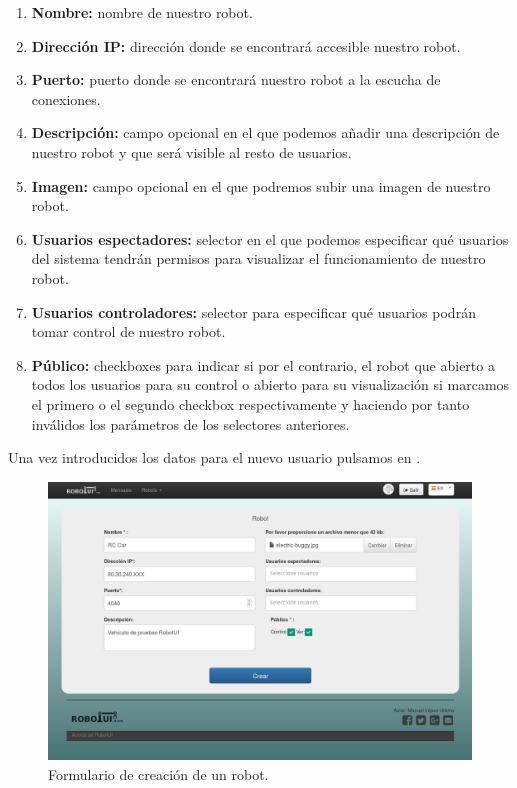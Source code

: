 \begin{enumerate}
 \item \textbf{Nombre:} nombre de nuestro robot.
 \item \textbf{Dirección IP:} dirección donde se encontrará accesible nuestro robot.
 \item \textbf{Puerto:} puerto donde se encontrará nuestro robot a la escucha de conexiones.
 \item \textbf{Descripción:} campo opcional en el que podemos añadir una descripción de nuestro robot y que será visible al resto de usuarios.
 \item \textbf{Imagen:} campo opcional en el que podremos subir una imagen de nuestro robot.
 \item \textbf{Usuarios espectadores:} selector en el que podemos especificar qué usuarios del sistema tendrán permisos para visualizar el funcionamiento de nuestro robot.
 \item \textbf{Usuarios controladores:} selector para especificar qué usuarios podrán tomar control de nuestro robot.
 \item \textbf{Público:} checkboxes para indicar si por el contrario, el robot que abierto a todos los usuarios para su control o abierto para su visualización si marcamos el primero o el segundo checkbox respectivamente
 y haciendo por tanto inválidos los parámetros de los selectores anteriores.
\end{enumerate}

Una vez introducidos los datos para el nuevo usuario pulsamos en .\\

\begin{figure}[H]
  \begin{center}
    \includegraphics[scale=0.3]{imagenes/manual-usuario/pagina-crear-robot.png}
  \end{center}
  \caption{Formulario de creación de un robot.}
  \label{website:creacion-robot}
\end{figure}


